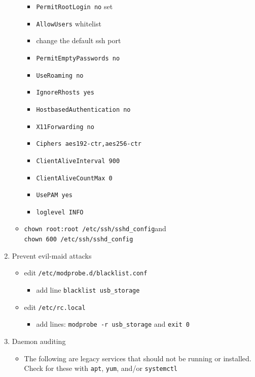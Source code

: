 \documentclass[12pt, letterpaper,oneocolumn]{article}
\begin{document}
\begin{appendices}
\begin{enumerate}
\begin{itemize}
    \begin{itemize}
    \item
      \texttt{PermitRootLogin\ no} set
    \item
      \texttt{AllowUsers} whitelist
    \item
      change the default ssh port
    \item
      \texttt{PermitEmptyPasswords\ no}
    \item
      \texttt{UseRoaming\ no}
    \item
      \texttt{IgnoreRhosts\ yes}
    \item
      \texttt{HostbasedAuthentication\ no}
    \item
      \texttt{X11Forwarding\ no}
    \item
      \texttt{Ciphers\ aes192-ctr,aes256-ctr}
    \item
      \texttt{ClientAliveInterval\ 900}
    \item
      \texttt{ClientAliveCountMax\ 0}
    \item
      \texttt{UsePAM\ yes}
    \item
      \texttt{loglevel\ INFO}
    \end{itemize}
  \item
    \texttt{chown\ root:root\ /etc/ssh/sshd\_config}and
    \texttt{chown\ 600\ /etc/ssh/sshd\_config}
  \end{itemize}
\item
  Prevent evil-maid attacks

  \begin{itemize}
  \item
    edit \texttt{/etc/modprobe.d/blacklist.conf}

    \begin{itemize}
    \item
      add line \texttt{blacklist\ usb\_storage}
    \end{itemize}
  \item
    edit \texttt{/etc/rc.local}

    \begin{itemize}
    \item
      add lines: \texttt{modprobe\ -r\ usb\_storage} and
      \texttt{exit\ 0}
    \end{itemize}
  \end{itemize}
\item
  Daemon auditing

  \begin{itemize}
  \item
    The following are legacy services that should not be running or
    installed. Check for these with \texttt{apt}, \texttt{yum}, and/or
    \texttt{systemctl}


\end{itemize}
\end{enumerate}
\end{appendices}
\end{document}
